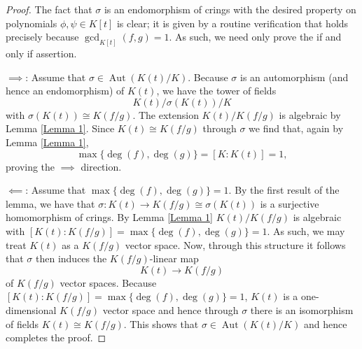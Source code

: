 \documentclass[10pt]{article}
\DeclareMathOperator{\aut}{Aut}
\DeclareMathOperator{\aut}{rank}
\numberwithin{Theorem}{section}
\begin{document}
\begin{proof}
The fact that $\sigma$ is an endomorphism of crings with the desired property on polynomials $\phi, \psi \in K[t]$ is clear; it is given by a routine verification that holds precisely because $\gcd_{K[t]}(f,g)=1$. As such, we need only prove the if and only if assertion. 

$\implies$: Assume that $\sigma \in \aut(K(t)/K)$. Because $\sigma$ is an automorphism (and hence an endomorphism) of $K(t)$, we have the tower of fields
$$ K(t)/\sigma(K(t))/K$$
with $\sigma(K(t)) \cong K(f/g)$. The extension $K(t)/K(f/g)$ is algebraic by Lemma \ref{Lemma 1}. Since $K(t) \cong K(f/g)$ through $\sigma$ we find that, again by Lemma \ref{Lemma 1},
$$ \max\lbrace\deg(f),\deg(g)\rbrace = [K:K(t)] = 1,$$
proving the $\implies$ direction.

$\impliedby$: Assume that $\max\lbrace \deg(f), \deg(g)\rbrace = 1$. 
By the first result of the lemma, we have that $\sigma:K(t) \to K(f/g) \cong \sigma(K(t))$ is a surjective homomorphism of crings. By Lemma \ref{Lemma 1} $K(t)/K(f/g)$ is algebraic with $[K(t):K(f/g)] = \max\lbrace \deg(f),\deg(g)\rbrace = 1$. As such, we may treat $K(t)$ as a $K(f/g)$ vector space. Now, through this structure it follows that $\sigma$ then induces the $K(f/g)$-linear map
$$ K(t) \to K(f/g)$$
of $K(f/g)$ vector spaces. Because $[K(t):K(f/g)] = \max\lbrace \deg(f),\deg(g)\rbrace = 1$, $K(t)$ is a one-dimensional $K(f/g)$ vector space and hence through $\sigma$ there is an isomorphism of fields $K(t) \cong K(f/g)$. This shows that $\sigma \in \aut(K(t)/K)$ and hence completes the proof.
\end{proof}
\end{document}
